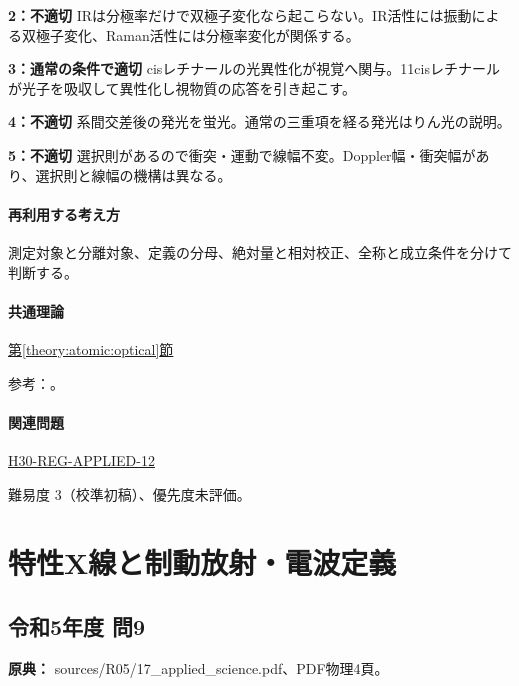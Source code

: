 \noindent\textbf{2：不適切} IRは分極率だけで双極子変化なら起こらない。IR活性には振動による双極子変化、Raman活性には分極率変化が関係する。\par

\noindent\textbf{3：通常の条件で適切} cisレチナールの光異性化が視覚へ関与。11cisレチナールが光子を吸収して異性化し視物質の応答を引き起こす。\par

\noindent\textbf{4：不適切} 系間交差後の発光を蛍光。通常の三重項を経る発光はりん光の説明。\par

\noindent\textbf{5：不適切} 選択則があるので衝突・運動で線幅不変。Doppler幅・衝突幅があり、選択則と線幅の機構は異なる。\par

\paragraph{再利用する考え方} 測定対象と分離対象、定義の分母、絶対量と相対校正、全称と成立条件を分けて判断する。

\paragraph{共通理論} \hyperref[theory:atomic:optical]{第\ref*{theory:atomic:optical}節}

\par 参考：\cite{atomic_ir_co2,atomic_ir_raman,atomic_retinal,atomic_linewidth}。

\paragraph{関連問題} \hyperref[q:h30-reg-applied-12]{H30-REG-APPLIED-12}

\par 難易度 3（校準初稿）、優先度未評価。

\section{特性X線と制動放射・電波定義}

\subsection{令和5年度 問9}
\label{q:r05-reg-applied-09}

\noindent\textbf{原典：} sources/R05/17\_applied\_science.pdf、PDF物理4頁。

